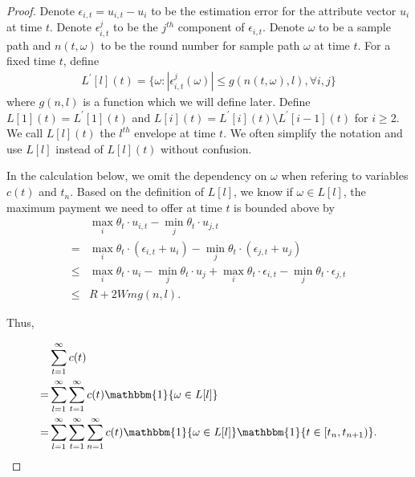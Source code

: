 \documentclass{article}
\begin{document}
\begin{proof}
Denote $\epsilon_{i,t}=u_{i,t}-u_{i}$ to be the estimation error for the attribute vector $u_i$ at time $t$. Denote $\epsilon_{i,t}^{j}$ to be the $j^{th}$ component of $\epsilon_{i,t}$. Denote $\omega$ to be a sample path and $n(t,\omega)$ to be the round number for sample path $\omega$ at time $t$. For a fixed time $t$, define
\begin{align}
L^{'}[l](t) = \{\omega:|\epsilon_{i,t}^{j}(\omega)|\leq g(n(t,\omega),l), \forall i,j\}\nonumber
\end{align}
where $g(n,l)$ is a function which we will define later. Define $L[1](t) = L^{'}[1](t)$ and $L[i](t) = L^{'}[i](t)\setminus L^{'}[i-1](t)$ for $i\geq 2$. We call $L[l](t)$ the $l^{th}$ envelope at time $t$. We often simplify the notation and use $L[l]$ instead of $L[l](t)$ without confusion.

In the calculation below, we omit the dependency on $\omega$ when refering to variables $c(t)$ and $t_n$. Based on the definition of $L[l]$, we know if $\omega\in L[l]$, the maximum payment we need to offer at time $t$ is bounded above by 
\begin{align}
&\max_{i}\theta_t\cdot u_{i,t} - \min_{j}\theta_t\cdot u_{j,t} \nonumber \\
= &\max_{i}\theta_t\cdot (\epsilon_{i,t}+u_i) - \min_{j}\theta_t\cdot (\epsilon_{j,t}+u_j) \nonumber \\
\leq &\max_{i}\theta_t\cdot u_i - \min_{j}\theta_t\cdot u_j +\max_{i}\theta_t\cdot \epsilon_{i,t} - \min_{j}\theta_t\cdot \epsilon_{j,t}\nonumber \\
\leq & R + 2Wmg(n,l). \nonumber
\end{align}

Thus,

\begin{align}
&\sum_{t=1}^{\infty}c(t) \nonumber \\
=&\sum_{l=1}^{\infty}\sum_{t=1}^{\infty}c(t)\mathbbm{1}\{\omega\in L[l]\} \nonumber \\
=&\sum_{l=1}^{\infty}\sum_{t=1}^{\infty}\sum_{n=1}^{\infty}c(t)\mathbbm{1}\{\omega\in L[l]\}\mathbbm{1}\{t\in [t_n,t_{n+1})\}. \nonumber
\end{align}


\end{proof}
\end{document}
